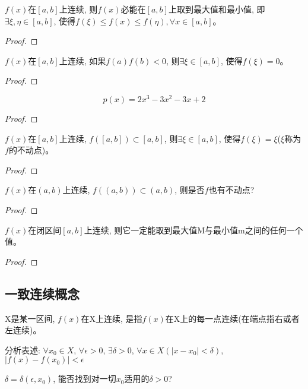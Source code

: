 \begin{theorem}[最值定理]
    $f(x)$在$[a, b]$上连续, 则$f(x)$必能在$[a, b]$上取到最大值和最小值, 即$\exists \xi, \eta \in [a, b]$, 使得$f(\xi) \le f(x) \le f(\eta), \forall x \in [a, b]$。
\end{theorem}
\begin{proof}
    
\end{proof}

\begin{theorem}[零点存在定理]
    $f(x)$在$[a, b]$上连续, 如果$f(a)f(b) < 0$, 则$\exists \xi \in [a, b]$, 使得$f(\xi) = 0$。
\end{theorem}
\begin{proof}
    
\end{proof}

\begin{proposition}
    \[ p(x) = 2x^3-3x^2-3x+2 \]
\end{proposition}
\begin{proof}
    
\end{proof}

\begin{proposition}
    $f(x)$在$[a, b]$上连续, $f([a, b]) \subset [a, b]$, 则$\exists \xi \in [a, b]$, 使得$f(\xi) = \xi$($\xi$称为$f$的不动点)。
\end{proposition}
\begin{proof}
    
\end{proof}

\begin{proposition}
    $f(x)$在$(a, b)$上连续, $f((a, b)) \subset (a, b)$, 则是否$f$也有不动点?
\end{proposition}
\begin{proof}
    
\end{proof}

\begin{theorem}[中间值定理]
    $f(x)$在闭区间$[a, b]$上连续, 则它一定能取到最大值M与最小值m之间的任何一个值。
\end{theorem}
\begin{proof}
    
\end{proof}

\subsection{一致连续概念}
\begin{definition}
    X是某一区间, $f(x)$在X上连续, 是指$f(x)$在X上的每一点连续(在端点指右或者左连续)。

    分析表述: $\forall x_0 \in X$, $\forall \epsilon > 0$, $\exists \delta > 0$, $\forall x \in X(\left| x - x_0 \right| < \delta)$, $\left| f(x) - f(x_0) \right| < \epsilon$
\end{definition}
$\delta = \delta(\epsilon, x_0)$, 能否找到对一切$x_0$适用的$\delta > 0$?

